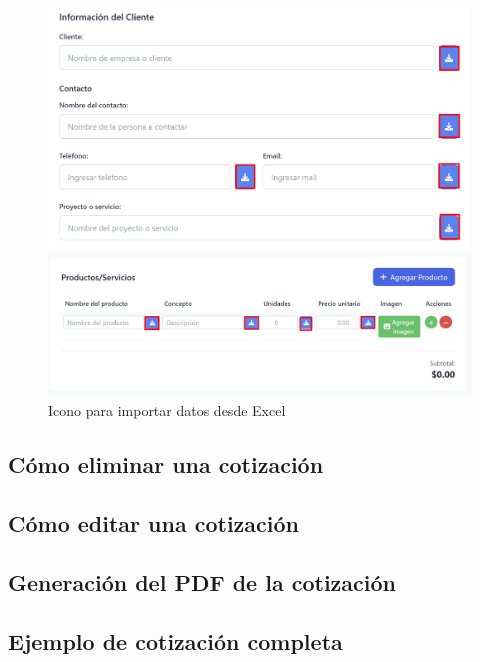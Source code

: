 \documentclass{Pretexto/bluereport}
\begin{document}
\begin{figure}[H]
    \centering
    \begin{minipage}{0.456\linewidth}
        \centering
        \includegraphics[width=\linewidth]{img/llenar_datos_excel.png}
    \end{minipage}
    \begin{minipage}{0.49\linewidth}
        \centering
        \includegraphics[width=\linewidth]{img/registrar_productos_excel.png}
    \end{minipage}

    \caption{Icono para importar datos desde Excel}
    \label{fig:icono-importar}
\end{figure}



\subsection{Cómo eliminar una cotización}
\subsection{Cómo editar una cotización}
\subsection{Generación del PDF de la cotización}
\subsection{Ejemplo de cotización completa}
\end{document}
